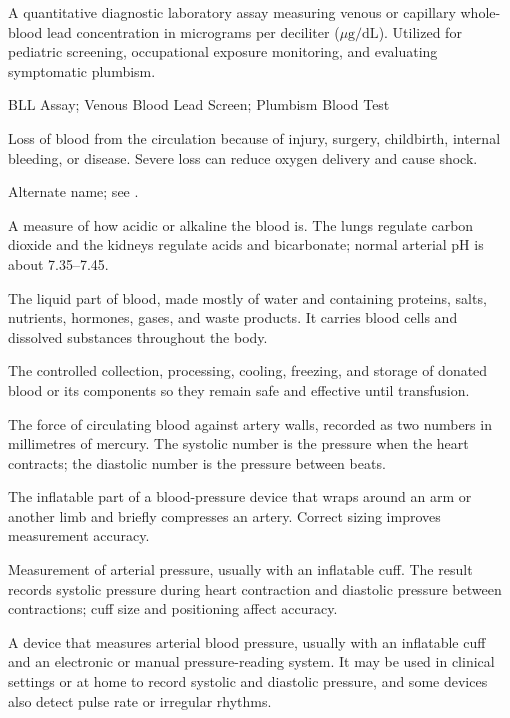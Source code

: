  A quantitative diagnostic laboratory assay measuring venous or capillary whole-blood lead concentration in micrograms per deciliter ($\mu\text{g/dL}$). Utilized for pediatric screening, occupational exposure monitoring, and evaluating symptomatic plumbism.

\synonyms
BLL Assay; Venous Blood Lead Screen; Plumbism Blood Test

 Loss of blood from the circulation because of injury, surgery, childbirth, internal bleeding, or disease. Severe loss can reduce oxygen delivery and cause shock.

 Alternate name; see .

 A measure of how acidic or alkaline the blood is. The lungs regulate carbon dioxide and the kidneys regulate acids and bicarbonate; normal arterial pH is about 7.35--7.45.

 The liquid part of blood, made mostly of water and containing proteins, salts, nutrients, hormones, gases, and waste products. It carries blood cells and dissolved substances throughout the body.

 The controlled collection, processing, cooling, freezing, and storage of donated blood or its components so they remain safe and effective until transfusion.

 The force of circulating blood against artery walls, recorded as two numbers in millimetres of mercury. The systolic number is the pressure when the heart contracts; the diastolic number is the pressure between beats.

 The inflatable part of a blood-pressure device that wraps around an arm or another limb and briefly compresses an artery. Correct sizing improves measurement accuracy.

 Measurement of arterial pressure, usually with an inflatable cuff. The result records systolic pressure during heart contraction and diastolic pressure between contractions; cuff size and positioning affect accuracy.

 A device that measures arterial blood pressure, usually with an inflatable cuff and an electronic or manual pressure-reading system. It may be used in clinical settings or at home to record systolic and diastolic pressure, and some devices also detect pulse rate or irregular rhythms.

